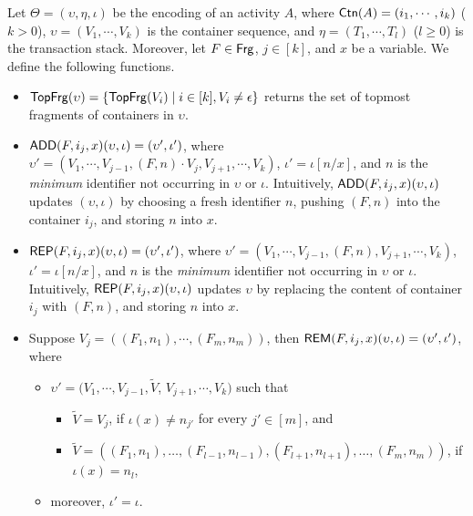 Let $\Theta = (\upsilon, \eta, \iota)$ be the encoding of an activity $A$, where ${\sf Ctn}(A) = (i_1, \cdots, i_k)$  ($k > 0$), $\upsilon = (V_1, \cdots, V_k)$ is the container sequence, and $\eta = (T_1, \cdots, T_l)$ ($l \ge 0$) is the transaction stack. Moreover, let $F \in {\sf Frg}$, $j \in [k]$, and $x$ be a variable. 
We define the following functions.

\begin{itemize}
\item %
${\sf TopFrg}(\upsilon) = \{{\sf TopFrg}(V_i) \mid i \in [k], V_i \neq \epsilon\}$ returns the set of topmost fragments of containers in $\upsilon$.
%
%
\item  $\mathsf{ADD}(F, i_j, x)(\upsilon, \iota) = (\upsilon', \iota')$, where $\upsilon' = (V_1, \cdots, V_{j-1}, (F, n) \cdot V_j, V_{j+1}, \cdots, V_k)$, $\iota' =\iota[n/x]$,  and $n$ is the \emph{minimum} identifier not occurring in $\upsilon$ or $\iota$. Intuitively, $\mathsf{ADD}(F, i_j, x)(\upsilon, \iota)$ updates $(\upsilon, \iota)$ by choosing a fresh identifier $n$, pushing $(F, n)$ into the container $i_j$, and storing $n$ into $x$. 
%
 \item $\mathsf{REP}(F, i_j, x)(\upsilon, \iota) =  (\upsilon', \iota')$, where $\upsilon' = (V_1, \cdots, V_{j-1}, (F, n), V_{j+1}, \cdots, V_k)$, $\iota' = \iota[n/x]$, and $n$ is the \emph{minimum} identifier not occurring in  $\upsilon$ or $\iota$. Intuitively, $\mathsf{REP}(F, i_j, x)(\upsilon, \iota)$ updates $\upsilon$ by replacing the content of container $i_j$ with $(F, n)$, and storing $n$ into $x$.
%
\item Suppose $V_j = ((F_1, n_1), \cdots, (F_{m}, n_m))$, then
%
$\mathsf{REM}(F, i_j, x)(\upsilon, \iota) = (\upsilon', \iota')$, 
%
where 
\begin{itemize}
\item $\upsilon' = (V_1, \cdots, V_{j-1}, \tilde{V}$, $V_{j+1}, \cdots, V_k)$ such that
\begin{itemize}
\item $\tilde{V} = V_j$,  if $\iota(x) \neq n_{j'}$ for every $j' \in [m]$, and 
\item $\tilde{V} = ((F_1,n_1), \dots, (F_{l-1}, n_{l-1}), (F_{l+1}, n_{l+1}), \dots, (F_{m}, n_m))$, if $\iota(x) = n_l$, 
\end{itemize}
\item moreover, $\iota' = \iota$.
\end{itemize}


\end{itemize}
